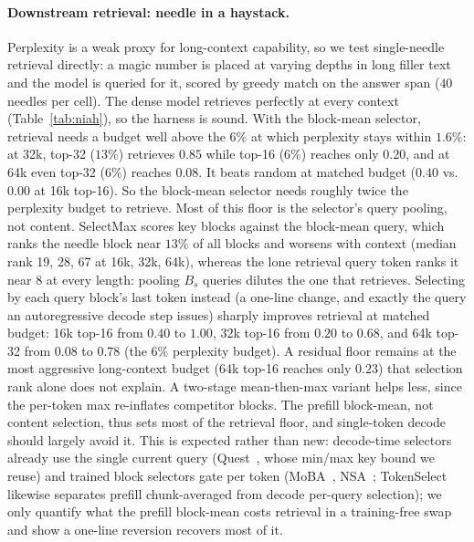 \documentclass[10pt,letterpaper]{article}
\begin{document}
\paragraph{Downstream retrieval: needle in a haystack.} Perplexity is a weak proxy
for long-context capability, so we test single-needle retrieval directly: a magic
number is placed at varying depths in long filler text and the model is queried for
it, scored by greedy match on the answer span ($40$ needles per cell). The dense
model retrieves perfectly at every context (Table~\ref{tab:niah}), so the harness is
sound. With the block-mean selector, retrieval needs a budget well above the $6\%$ at
which perplexity stays within $1.6\%$: at 32k, top-32 ($13\%$) retrieves $0.85$ while
top-16 ($6\%$) reaches only $0.20$, and at 64k even top-32 ($6\%$) reaches $0.08$. It
beats random at matched budget ($0.40$ vs.\ $0.00$ at 16k top-16). So the block-mean
selector needs roughly twice the perplexity budget to retrieve.
Most of this floor is the selector's query pooling, not content. SelectMax scores
key blocks against the block-mean query, which ranks the needle block near $13\%$ of
all blocks and worsens with context (median rank 19, 28, 67 at 16k, 32k, 64k),
whereas the lone retrieval query token ranks it near 8 at every length: pooling
$B_s$ queries dilutes the one that retrieves. Selecting by each query block's last
token instead (a one-line change, and exactly the query an autoregressive decode step
issues) sharply improves retrieval at matched budget: 16k top-16 from $0.40$ to
$1.00$, 32k top-16 from $0.20$ to $0.68$, and 64k top-32 from $0.08$ to $0.78$ (the
$6\%$ perplexity budget). A residual floor remains at the most aggressive
long-context budget (64k top-16 reaches only $0.23$) that selection rank alone does
not explain. A
two-stage mean-then-max variant helps less, since the per-token max re-inflates
competitor blocks. The prefill block-mean, not content selection, thus sets most of
the retrieval floor, and single-token decode should largely avoid it. This is
expected rather than new: decode-time selectors already use the single current query
(Quest~\cite{tang2024quest}, whose min/max key bound we reuse) and trained block
selectors gate per token (MoBA~\cite{lu2025moba}, NSA~\cite{yuan2025nsa};
TokenSelect~\cite{wu2024tokenselect} likewise separates prefill chunk-averaged from
decode per-query selection); we only quantify what the prefill block-mean costs
retrieval in a training-free swap and show a one-line reversion recovers most of it.
\end{document}
